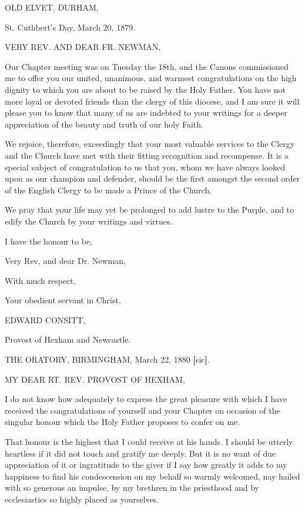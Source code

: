 OLD ELVET, DURHAM,

St. Cuthbert's Day, March 20, 1879.

VERY REV. AND
DEAR FR. NEWMAN,

Our Chapter meeting was on Tuesday the 18th, and the Canons
commissioned me to offer you our united, unanimous, and warmest
congratulations on the high dignity to which you are about to be
raised by the Holy Father. You have not more loyal or devoted friends
than the clergy of this diocese, and I am sure it will please you to
know that many of us are indebted to your writings for a deeper
appreciation of the beauty and truth of our holy Faith.

We rejoice, therefore, exceedingly that your most valuable services
to the Clergy and the Church have met with their fitting recognition
and recompense. It is a special subject of congratulation to us that
you, whom we have always looked upon as our champion and defender,
should be the first amongst the second order of the English Clergy to
be made a Prince of the Church.

We pray that your life may yet be prolonged to add lustre to the
Purple, and to edify the Church by your writings and virtues.

I have the honour to be,

Very Rev, and dear Dr. Newman,

With much respect,

Your obedient servant in Christ,

EDWARD CONSITT,

Provost of Hexham and Newcastle.


THE ORATORY, BIRMINGHAM,
March 22, 1880 \textbf{[}sic\textbf{]}.

MY DEAR RT.
REV. PROVOST OF
HEXHAM,

I do not know how adequately to express the great pleasure with which
I have received the congratulations of yourself and your Chapter on
occasion of the singular honour which the Holy Father proposes to
confer on me.

That honour is the highest that I could receive at his hands. I
should be utterly heartless if it did not touch and gratify me deeply.
But it is no want of due appreciation of it or ingratitude to the
giver if I say how greatly it adds to my happiness to find his
condescension on my behalf so warmly welcomed, nay hailed with so
generous an impulse, by my brethren in the priesthood and by
ecclesiastics so highly placed as yourselves.

